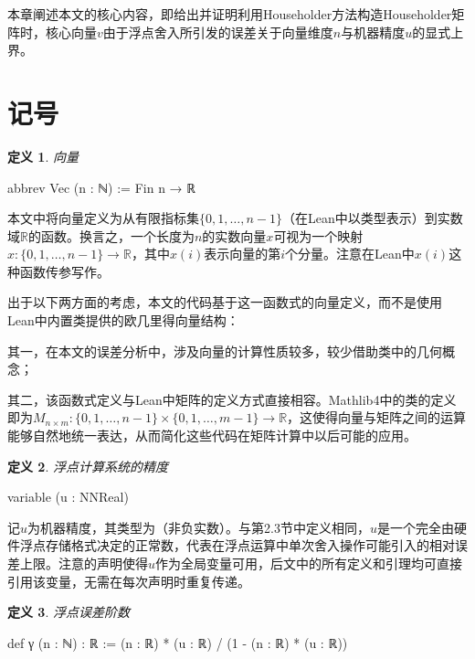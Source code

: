 ﻿\documentclass[UTF8,a4paper,openany]{ctexbook}
\theoremstyle{qrplain}
\newtheorem{definition}{定义}[chapter]
\begin{document}
本章阐述本文的核心内容，即给出并证明利用Householder方法构造Householder矩阵时，核心向量$v$由于浮点舍入所引发的误差关于向量维度$n$与机器精度$u$的显式上界。

\section{记号}

\begin{definition}
  向量
\end{definition}
\begin{leancode}
  abbrev Vec (n : ℕ) := Fin n → ℝ
\end{leancode}

本文中将向量定义为从有限指标集$\{0,1,\dots,n-1\}$（在Lean中以类型表示）到实数域$\mathbb{R}$的函数。换言之，一个长度为$n$的实数向量$x$可视为一个映射$x: \{0,1,\dots,n-1\}\to\mathbb{R}$，其中$x(i)$表示向量的第$i$个分量。注意在Lean中$x(i)$这种函数传参写作。

出于以下两方面的考虑，本文的代码基于这一函数式的向量定义，而不是使用Lean中内置类提供的欧几里得向量结构：

其一，在本文的误差分析中，涉及向量的计算性质较多，较少借助类中的几何概念；

其二，该函数式定义与Lean中矩阵的定义方式直接相容。Mathlib4中的类的定义即为$M_{n\times m}: \{0,1,\dots,n-1\}\times\{0,1,\dots,m-1\}\to\mathbb{R}$，这使得向量与矩阵之间的运算能够自然地统一表达，从而简化这些代码在矩阵计算中以后可能的应用。

\begin{definition}
  浮点计算系统的精度
\end{definition}
\begin{leancode}
  variable (u : NNReal)
\end{leancode}

记$u$为机器精度，其类型为（非负实数）。与第2.3节中定义相同，$u$是一个完全由硬件浮点存储格式决定的正常数，代表在浮点运算中单次舍入操作可能引入的相对误差上限。注意的声明使得$u$作为全局变量可用，后文中的所有定义和引理均可直接引用该变量，无需在每次声明时重复传递。

\begin{definition}
\label{def:gamma}
  浮点误差阶数
\end{definition}
\begin{leancode}
  def γ (n : ℕ) : ℝ := (n : ℝ) * (u : ℝ) / (1 - (n : ℝ) * (u : ℝ))
\end{leancode}
\end{document}
